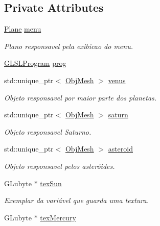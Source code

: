 \subsection*{Private Attributes}
\begin{DoxyCompactItemize}
\item 
\mbox{\hyperlink{class_plane}{Plane}} \mbox{\hyperlink{class_scene_texture_acd845ab828b015b22f1b92a111130076}{menu}}
\begin{DoxyCompactList}\small\item\em Plano responsavel pela exibicao do menu. \end{DoxyCompactList}\item 
\mbox{\hyperlink{class_g_l_s_l_program}{G\+L\+S\+L\+Program}} \mbox{\hyperlink{class_scene_texture_abe4ceb019975a851e93b9fe39bc12850}{prog}}
\item 
std\+::unique\+\_\+ptr$<$ \mbox{\hyperlink{class_obj_mesh}{Obj\+Mesh}} $>$ \mbox{\hyperlink{class_scene_texture_a828f9a79b2003b21d0ce58f4960a608d}{venus}}
\begin{DoxyCompactList}\small\item\em Objeto responsavel por maior parte dos planetas. \end{DoxyCompactList}\item 
std\+::unique\+\_\+ptr$<$ \mbox{\hyperlink{class_obj_mesh}{Obj\+Mesh}} $>$ \mbox{\hyperlink{class_scene_texture_a33b834bc0cc2b8eaf72e4abfe05220dc}{saturn}}
\begin{DoxyCompactList}\small\item\em Objeto responsavel Saturno. \end{DoxyCompactList}\item 
std\+::unique\+\_\+ptr$<$ \mbox{\hyperlink{class_obj_mesh}{Obj\+Mesh}} $>$ \mbox{\hyperlink{class_scene_texture_a1bc3b7ec6a567f84de74089223004fb7}{asteroid}}
\begin{DoxyCompactList}\small\item\em Objeto responsavel pelos asteróides. \end{DoxyCompactList}\item 
G\+Lubyte $\ast$ \mbox{\hyperlink{class_scene_texture_aaa5fdc31a3a25575c7b547f719c46f1c}{tex\+Sun}}
\begin{DoxyCompactList}\small\item\em Exemplar da variável que guarda uma textura. \end{DoxyCompactList}\item 
G\+Lubyte $\ast$ \mbox{\hyperlink{class_scene_texture_aaee7f2e920954368fbd97f448ff4228f}{tex\+Mercury}}

\end{DoxyCompactItemize}
